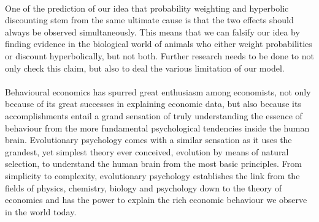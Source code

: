 \documentclass[a4paper,10pt]{article}
\numberwithin{equation}{section}
\begin{document}
\\
One of the prediction of our idea that probability weighting and hyperbolic discounting stem from the same ultimate cause is that the two effects should always be observed simultaneously. This means that we can falsify our idea by finding evidence in the biological world of animals who either weight probabilities or discount hyperbolically, but not both. Further research needs to be done to not only check this claim, but also to deal the various limitation of our model.\\
\\
Behavioural economics has spurred great enthusiasm among economists, not only because of its great successes in explaining economic data, but also because its accomplishments entail a grand sensation of truly understanding the essence of behaviour from the more fundamental psychological tendencies inside the human brain. Evolutionary psychology comes with a similar sensation as it uses the grandest, yet simplest theory ever conceived, evolution by means of natural selection, to understand the human brain from the most basic principles. From simplicity to complexity, evolutionary psychology establishes the link from the fields of physics, chemistry, biology and psychology down to the theory of economics and has the power to explain the rich economic behaviour we observe in the world today.

\newpage

\label{sec:Bibliography}
\renewcommand{\refname}{Bibliography\\} 


\end{document}
